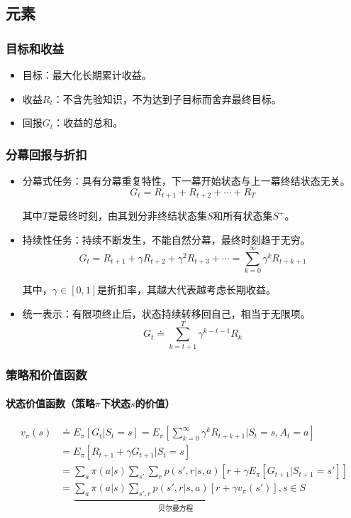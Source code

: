 \documentclass[
12pt, %
a4paper, 
oneside, %
headinclude,footinclude, %
]{scrartcl}
\begin{document}
\subsection{元素}
\subsubsection{目标和收益}
\begin{itemize}
\item 目标：最大化长期累计收益。
\item 收益$ R_t $：不含先验知识，不为达到子目标而舍弃最终目标。
\item 回报$ G_t $：收益的总和。
\end{itemize}
\subsubsection{分幕回报与折扣}
\begin{itemize}
\item 分幕式任务：具有分幕重复特性，下一幕开始状态与上一幕终结状态无关。
$$ G_t = R_{t + 1} + R_{t + 2} + \cdots + R_T $$

其中$ T $是最终时刻，由其划分非终结状态集$ S $和所有状态集$ S^+ $。
\item 持续性任务：持续不断发生，不能自然分幕，最终时刻趋于无穷。
$$ G_t = R_{t + 1} + \gamma R_{t + 2} + \gamma^2 R_{t + 3} + \cdots = \sum_{k = 0}^{\infty} \gamma^k R_{t + k + 1} $$

其中，$ \gamma \in [0, 1] $是折扣率，其越大代表越考虑长期收益。
\item 统一表示：有限项终止后，状态持续转移回自己，相当于无限项。
$$ G_t \doteq \sum_{k = t + 1}^{T} \gamma^{k - t - 1} R_k $$
\end{itemize}
\subsubsection{策略和价值函数}
\paragraph{状态价值函数（策略$ \pi $下状态$ s $的价值）}
\begin{align*}
v_\pi(s) 
&\doteq E_\pi[G_t|S_t = s] = E_\pi[\sum_{k = 0}^{\infty} \gamma^k R_{t + k + 1}|S_t = s, A_t = a]\\
&= E_\pi[R_{t + 1} + \gamma G_{t+1}|S_t = s] \\
&= \sum_a \pi(a|s) \sum_{s'} \sum_r p(s', r|s, a)[r + \gamma E_\pi[G_{t + 1}|S_{t + 1} = s']] \\
&= \underbrace{\sum_a \pi(a|s) \sum_{s', r} p(s', r|s, a)[r + \gamma v_\pi(s')]}_{贝尔曼方程}, s \in S
\end{align*}
\end{document}
